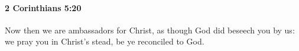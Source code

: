 			\begin{framed}
			\scriptsize
				\begin{compactdesc}
					\item[SBLG]  \hyperref[KATALLASSO]{}  \hyperref[KATALLAGE]{}
				\end{compactdesc}
			\end{framed}

		\paragraph{2 Corinthians 5:20} %
			\label{2CORINTHIANS-5-20}

			Now then we are ambassadors for Christ, as though God did beseech you by us: we pray you in Christ's stead, be ye reconciled to God.

			\begin{framed}
			\scriptsize
				\begin{compactdesc}
					\item[SBLG]  \hyperref[KATALLASSO]{} \gr{τῷ θεῷ.}
				\end{compactdesc}
			\end{framed}

